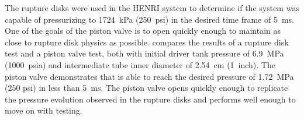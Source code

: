 The rupture disks were used in the HENRI system to determine if the system was capable of pressurizing to \SI{1724}{\kilo\pascal} (\SI{250}{psi}) in the desired time frame of \SI{5}{\milli\second}\cite{HeNURETH}. One of the goals of the piston valve is to open quickly enough to maintain as close to rupture disk physics as possible. 
 compares the results of a rupture disk test and a piston valve test, both with initial driver tank pressure of \SI{6.9}{\mega\pascal} (\SI{1000}{psia}) and intermediate tube inner diameter of \SI{2.54}{\centi\meter} (\SI{1}{inch}). The piston valve demonstrates that is able to reach the desired pressure of \SI{1.72}{\mega\pascal} (250 psi) in less than \SI{5}{\milli\second}. The piston valve opens quickly enough to replicate the pressure evolution observed in the rupture disks and performs well enough to move on with testing.









